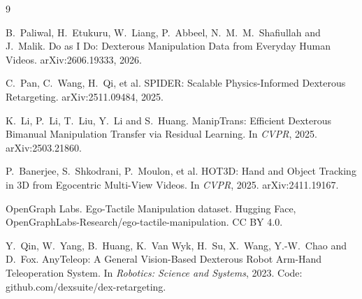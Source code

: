 \documentclass[10pt,twocolumn,letterpaper]{article}
\begin{document}
\begin{thebibliography}{9}
\footnotesize\raggedright
\setlength{\itemsep}{1pt}

B.~Paliwal, H.~Etukuru, W.~Liang, P.~Abbeel, N.~M.~M.~Shafiullah and
J.~Malik.
Do as I Do: Dexterous Manipulation Data from Everyday Human Videos.
arXiv:2606.19333, 2026.

C.~Pan, C.~Wang, H.~Qi, et al.
SPIDER: Scalable Physics-Informed Dexterous Retargeting.
arXiv:2511.09484, 2025.

K.~Li, P.~Li, T.~Liu, Y.~Li and S.~Huang.
ManipTrans: Efficient Dexterous Bimanual Manipulation Transfer via Residual
Learning.
In \emph{CVPR}, 2025. arXiv:2503.21860.

P.~Banerjee, S.~Shkodrani, P.~Moulon, et al.
HOT3D: Hand and Object Tracking in 3D from Egocentric Multi-View Videos.
In \emph{CVPR}, 2025. arXiv:2411.19167.

OpenGraph Labs.
Ego-Tactile Manipulation dataset. Hugging Face,
OpenGraphLabs-Research/ego-tactile-manipulation. CC BY 4.0.

Y.~Qin, W.~Yang, B.~Huang, K.~Van Wyk, H.~Su, X.~Wang, Y.-W.~Chao and
D.~Fox.
AnyTeleop: A General Vision-Based Dexterous Robot Arm-Hand Teleoperation
System.
In \emph{Robotics: Science and Systems}, 2023. Code:
github.com/dexsuite/dex-retargeting.

\end{thebibliography}
\end{document}
